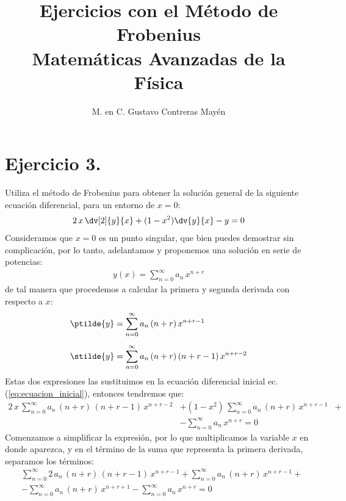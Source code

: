 
\title{Ejercicios con el Método de Frobenius\\ \large{Matemáticas Avanzadas de la Física}\vspace{-3ex}}
\author{M. en C. Gustavo Contreras Mayén}
\date{ }

\vspace{-4cm}
\maketitle
\fontsize{14}{14}\selectfont
\section{Ejercicio 3.}
Utiliza el método de Frobenius para obtener la solución general de la siguiente ecuación diferencial, para un entorno de $x = 0$:
\begin{align}
2 \, x \, \dv[2]{y}{x} + (1 - x^{2}) \dv{y}{x} - y = 0
\label{eq:ecuacion_inicial}
\end{align}
Consideramos que $x = 0$ es un punto singular, que bien puedes demostrar sin complicación, por lo tanto, adelantamos y proponemos una solución en serie de potencias:
\begin{align*}
y(x) = \sum_{n=0}^{\infty} a_{n} \, x^{n+r}
\end{align*}
de tal manera que procedemos a calcular la primera y segunda derivada con respecto a $x$:
\begin{align*}
\ptilde{y} &= \sum_{n=0}^{\infty} a_{n} \, (n + r) \, x^{n+r-1} \\[0.5em]
\stilde{y} &= \sum_{n=0}^{\infty} a_{n} \, (n + r) \, (n + r - 1) \, x^{n+r-2}
\end{align*}
Estas dos expresiones las sustituimos en la ecuación diferencial inicial ec. (\ref{eq:ecuacion_inicial}), entonces tendremos que:
\begin{align*}
2 \, x \, \sum_{n=0}^{\infty} a_{n} \, (n + r) \, (n + r - 1) \, x^{n+r-2} &+ (1 - x^{2}) \, \sum_{n=0}^{\infty} a_{n} \, (n + r) \, x^{n+r-1} &+\\[0.5em]
&- \sum_{n=0}^{\infty} a_{n} \, x^{n+r} = 0
\end{align*}
Comenzamos a simplificar la expresión, por lo que multiplicamos la variable $x$ en donde aparezca, y en el término de la suma que representa la primera derivada, separamos los términos:
\begin{align*}
&\sum_{n=0}^{\infty} 2 \, a_{n} \, (n + r) \, (n + r - 1) \, x^{n+r-1} + \sum_{n=0}^{\infty} a_{n} \, (n + r) \, x^{n+r-1} + \\[0.5em]
&- \sum_{n=0}^{\infty} a_{n} \, (n + r) \, x^{n+r+1} -
\sum_{n=0}^{\infty} a_{n} \, x^{n+r} = 0
\end{align*}
